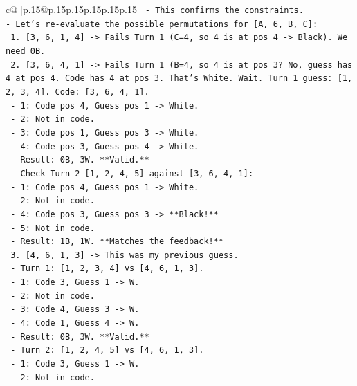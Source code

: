 \documentclass{article}
\begin{document}
{\begin{supertabular}{c@{$\;$}|p{.15\linewidth}@{}p{.15\linewidth}p{.15\linewidth}p{.15\linewidth}p{.15\linewidth}p{.15\linewidth}}
{{{\texttt{        {-} This confirms the constraints.} \\
\texttt{{-} Let's re{-}evaluate the possible permutations for {[}A, 6, B, C{]}:} \\
\texttt{    1.  {[}3, 6, 1, 4{]} {-}> Fails Turn 1 (C=4, so 4 is at pos 4 {-}> Black). We need 0B.} \\
\texttt{    2.  {[}3, 6, 4, 1{]} {-}> Fails Turn 1 (B=4, so 4 is at pos 3? No, guess has 4 at pos 4. Code has 4 at pos 3. That's White. Wait. Turn 1 guess: {[}1, 2, 3, 4{]}. Code: {[}3, 6, 4, 1{]}.} \\
\texttt{        {-} 1: Code pos 4, Guess pos 1 {-}> White.} \\
\texttt{        {-} 2: Not in code.} \\
\texttt{        {-} 3: Code pos 1, Guess pos 3 {-}> White.} \\
\texttt{        {-} 4: Code pos 3, Guess pos 4 {-}> White.} \\
\texttt{        {-} Result: 0B, 3W. **Valid.**} \\
\texttt{        {-} Check Turn 2 {[}1, 2, 4, 5{]} against {[}3, 6, 4, 1{]}:} \\
\texttt{            {-} 1: Code pos 4, Guess pos 1 {-}> White.} \\
\texttt{            {-} 2: Not in code.} \\
\texttt{            {-} 4: Code pos 3, Guess pos 3 {-}> **Black!**} \\
\texttt{            {-} 5: Not in code.} \\
\texttt{            {-} Result: 1B, 1W. **Matches the feedback!**} \\
\texttt{    3.  {[}4, 6, 1, 3{]} {-}> This was my previous guess.} \\
\texttt{        {-} Turn 1: {[}1, 2, 3, 4{]} vs {[}4, 6, 1, 3{]}.} \\
\texttt{            {-} 1: Code 3, Guess 1 {-}> W.} \\
\texttt{            {-} 2: Not in code.} \\
\texttt{            {-} 3: Code 4, Guess 3 {-}> W.} \\
\texttt{            {-} 4: Code 1, Guess 4 {-}> W.} \\
\texttt{            {-} Result: 0B, 3W. **Valid.**} \\
\texttt{        {-} Turn 2: {[}1, 2, 4, 5{]} vs {[}4, 6, 1, 3{]}.} \\
\texttt{            {-} 1: Code 3, Guess 1 {-}> W.} \\
\texttt{            {-} 2: Not in code.} \\
}}}
\end{supertabular}}
\end{document}
